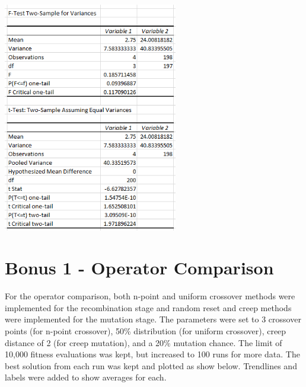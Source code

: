 \documentclass[11pt]{article}
\begin{document}
\begin{center}
\includegraphics[width=3in]{stat_anal_3.png}\\
\end{center}

\section{Bonus 1 - Operator Comparison}\indent

For the operator comparison, both n-point and uniform crossover methods were implemented for the recombination stage and random reset and creep methods were implemented for the mutation stage. The parameters were set to 3 crossover points (for n-point crossover), 50\% distribution (for uniform crossover), creep distance of 2 (for creep mutation), and a 20\% mutation chance. The limit of 10,000 fitness evaluations was kept, but increased to 100 runs for more data. The best solution from each run was kept and plotted as show below. Trendlines and labels were added to show averages for each.
\end{document}
